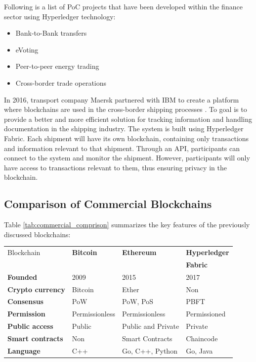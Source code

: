 Following is a list of PoC projects that have been developed within the finance sector using Hyperledger technology:

\begin{itemize}
\item Bank-to-Bank transfers \cite{bank}
\item eVoting \cite{evoting}
\item Peer-to-peer energy trading \cite{nadgrid}
\item Cross-border trade operations \cite{border}
\end{itemize}

In 2016, transport company Maersk partnered with IBM to create a platform where blockchains are used in the cross-border shipping processes \cite{tu}. To goal is to provide a better and more efficient solution for tracking information and handling documentation in the shipping industry. The system is built using Hyperledger Fabric. Each shipment will have its own blockchain, containing only transactions and information relevant to that shipment. Through an API, participants can connect to the system and monitor the shipment. However, participants will only have access to transactions relevant to them, thus ensuring privacy in the blockchain.

\subsection{Comparison of Commercial Blockchains}
Table \ref{tab:commercial_comprison} summarizes the key features of the previously discussed blockchains: 
\begin{center}
\label{tab:commercial_comprison}
\begin{tabular}{ |l|l|l|l|} 
   
   \hline
   Blockchain  & \textbf{Bitcoin} & \textbf{Ethereum} & \textbf{Hyperledger} \\
    & & & \textbf{Fabric} \\ 
   \hline
   \textbf{Founded} & 2009 & 2015 & 2017 \\
   	\hline
   \textbf{Crypto currency} & Bitcoin & Ether & Non \\
   	\hline
   \textbf{Consensus} & PoW & PoW, PoS & PBFT \\
   	\hline
   \textbf{Permission} & Permissionless & Permissionless & Permissioned \\
   	\hline
   \textbf{Public access} & Public & Public and Private & Private \\
   	\hline
   \textbf{Smart contracts} & Non & Smart Contracts & Chaincode \\
   	\hline
   \textbf{Language} & C++ & Go, C++, Python & Go, Java \\
   	\hline

\end{tabular}
\end{center}

